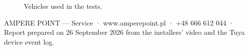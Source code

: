 \documentclass[11pt,a4paper]{article}
\begin{document}
\begin{figure}[H]
\centering
{}\hspace{1.2cm}
\caption{Vehicles used in the tests.}
\label{fig:cars}
\end{figure}

{\color{apmuted}\small AMPERE POINT — Service · www.amperepoint.pl · +48 666 612 044 · Report prepared on 26 September 2026 from the installers' video and the Tuya device event log.}
\end{document}
